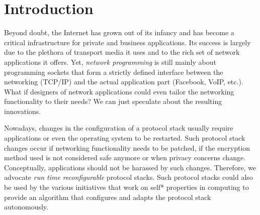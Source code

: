 \documentclass{sig-alternate}
\begin{document}



\section{Introduction}
Beyond doubt, the Internet has grown out of its infancy and has become a
critical infrastructure for private and business applications. Its success is
largely due to the plethora of transport media 
it uses and to the rich set of network applications 
it offers. Yet, \emph{network programming} is still
mainly about programming sockets that form a strictly defined interface between
the networking (TCP/IP) and the actual application part (Facebook, VoIP, etc.).
What if designers of network applications could even tailor the networking
functionality to their needs? We can just speculate about the resulting
innovations. 

Nowadays, changes in the configuration of a protocol stack usually require applications or even the operating system to be restarted. 
Such protocol stack changes occur if networking functionality needs to be patched, if the encryption method used is not considered safe anymore or when privacy concerns change. Conceptually, applications should not be harassed by such changes. Therefore, we advocate \textit{run time reconfigurable} protocol stacks. Such protocol stacks could also be used by the various initiatives that work on self* properties in computing to provide an algorithm that configures and adapts the protocol stack autonomously.



\end{document}
